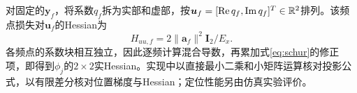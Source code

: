 对固定的$\bm y_f$，将系数$q_f$拆为实部和虚部，按$\bm u_f=[\operatorname{Re} q_f,\operatorname{Im}q_f]^T\in\mathbb R^2$排列。该频点损失对$\bm u_f$的Hessian为
\begin{equation}
 H_{uu,f}=2\|\bm a_f\|^2\bm I_2/E_x .
\end{equation}
各频点的系数块相互独立，因此逐频计算混合导数，再累加式\eqref{eq:schur}的修正项，即得到$\phi_j$的$2\times2$实Hessian。实现中以直接最小二乘和小矩阵运算核对投影公式，以有限差分核对位置梯度与Hessian；定位性能另由仿真实验评价。
